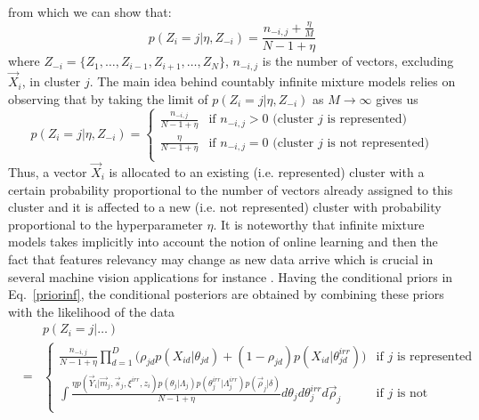 \documentclass[journal,10pt]{elsart}
\begin{document}
 from which we can show that:
\begin{equation}\label{priormissing}
p(Z_{i}=j|\eta,Z_{-i})=\frac{n_{-i,j}+\frac{\eta}{M}}{N-1+\eta}
\end{equation}
where
$Z_{-i}=\{Z_1,\ldots,Z_{i-1},Z_{i+1},\ldots,Z_N\}$,
$n_{-i,j}$ is the number of vectors, excluding $\vec{X}_i$, in
cluster $j$. The main idea behind countably infinite mixture models relies on observing that by taking the limit of $p(Z_{i}=j|\eta,Z_{-i})$ as $M \rightarrow \infty$ gives us \cite{Neal2000,Edward2000}
\begin{equation}\label{priorinf}
p(Z_{i}=j|\eta,Z_{-i})=\left \{
\begin{array}{cc}
\frac{n_{-i,j}}{N-1+\eta} &\textrm{if $n_{-i,j}>0$ (cluster $j$ is represented)}\\
\frac{\eta}{N-1+\eta} &\textrm{if $n_{-i,j}=0$ (cluster $j$ is not represented)}\\
\end{array}\right.
\end{equation}
Thus, a vector $\vec{X}_i$ is allocated to an existing (i.e. represented) cluster with a certain probability proportional to the number of vectors already assigned to this cluster and it is affected to a new (i.e. not represented) cluster with probability proportional to the hyperparameter $\eta$. It is noteworthy that infinite mixture models takes implicitly into account the notion of online learning and then the fact that features relevancy may change as new data arrive which is crucial in several machine vision applications for instance \cite{Baluja1997}. Having the conditional priors in Eq.~\ref{priorinf}, the conditional
posteriors are obtained by combining these priors with the
likelihood of the data \cite{Neal2000,Edward2000}
\begin{eqnarray}\label{posteriorinf}
&&\nonumber p(Z_{i}=j|\ldots)\\&=&\left\{
\begin{array}{cc}
\frac{n_{-i,j}}{N-1+\eta}\prod_{d=1}^D \big(\rho_{jd} p(X_{id}|\theta_{jd})+(1-\rho_{jd}) p(X_{id}|\theta^{irr}_{jd})) &\textrm{if $j$ is represented}\\
\int \frac{\eta p(\vec{Y}_i|\vec{m}_j,\vec{s}_j,\xi^{irr},z_i) p(\theta_j|\Lambda_j)p(\theta^{irr}_j |\Lambda^{irr}_j)p(\vec{\rho}_j|\delta)}{N-1+\eta} d\theta_j d\theta^{irr}_j d\vec{\rho}_j &\textrm{if $j$ is not represented}\\
\end{array}\right.
\end{eqnarray}
\end{document}
